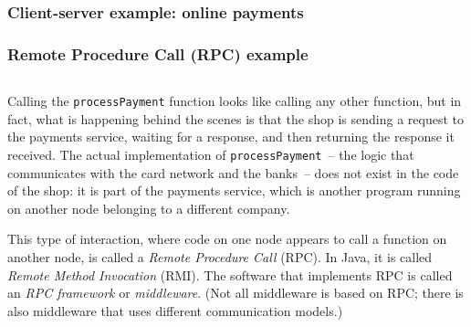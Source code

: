 \begin{frame}
    \label{s:payment-example}
    \frametitle{Client-server example: online payments}
    \begin{center}
    \end{center}
\end{frame}

\begin{frame}
    \label{s:payment-rpc}
    \frametitle{Remote Procedure Call (RPC) example}
    \inputminted{java}{code/payment-rpc.java}
\end{frame}
\label{l:payment-rpc}

Calling the \verb|processPayment| function looks like calling any other function, but in fact, what is happening behind the scenes is that the shop is sending a request to the payments service, waiting for a response, and then returning the response it received.
The actual implementation of \verb|processPayment|~-- the logic that communicates with the card network and the banks~-- does not exist in the code of the shop: it is part of the payments service, which is another program running on another node belonging to a different company.

This type of interaction, where code on one node appears to call a function on another node, is called a \emph{Remote Procedure Call} (RPC).
In Java, it is called \emph{Remote Method Invocation} (RMI).
The software that implements RPC is called an \emph{RPC framework} or \emph{middleware}.
(Not all middleware is based on RPC; there is also middleware that uses different communication models.)


